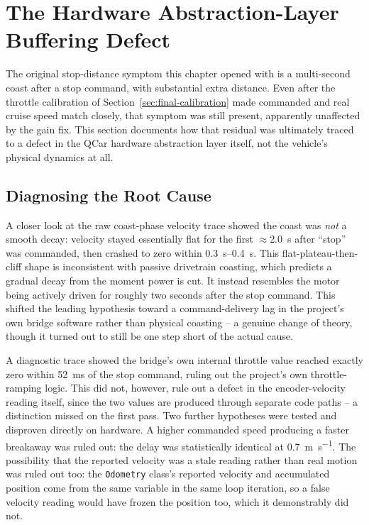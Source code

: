 \section{The Hardware Abstraction-Layer Buffering Defect}
\label{sec:readmode-bug}

The original stop-distance symptom this chapter opened with is a
multi-second coast after a stop command, with substantial extra
distance. Even after the throttle calibration of
Section~\ref{sec:final-calibration} made commanded and real cruise
speed match closely, that symptom was still present, apparently
unaffected by the gain fix. This section documents how that residual
was ultimately traced to a defect in the QCar hardware abstraction
layer itself, not the vehicle's physical dynamics at all.

\subsection{Diagnosing the Root Cause}
\label{sec:coast-shape-analysis}

A closer look at the raw coast-phase velocity trace showed the coast
was \emph{not} a smooth decay: velocity stayed essentially flat for
the first $\approx$\SI{2.0}{\second} after ``stop'' was commanded,
then crashed to zero within \SIrange{0.3}{0.4}{\second}. This
flat-plateau-then-cliff shape is inconsistent with passive drivetrain
coasting, which predicts a gradual decay from the moment power is
cut. It instead resembles the motor being actively driven for
roughly two seconds after the stop command. This shifted the leading
hypothesis toward a command-delivery lag in the project's own bridge
software rather than physical coasting -- a genuine change of theory,
though it turned out to still be one step short of the actual cause.

A diagnostic trace showed the bridge's own internal throttle value
reached exactly zero within \SI{52}{\milli\second} of the stop
command, ruling out the project's own throttle-ramping logic. This
did not, however, rule out a defect in the encoder-velocity reading
itself, since the two values are produced through separate code
paths -- a distinction missed on the first pass. Two further
hypotheses were tested and disproven directly on hardware. A higher
commanded speed producing a faster breakaway was ruled out: the
delay was statistically identical at \SI{0.7}{\meter\per\second}.
The possibility that the reported velocity was a stale reading
rather than real motion was ruled out too: the \texttt{Odometry}
class's reported velocity and accumulated position come from the
same variable in the same loop iteration, so a false velocity
reading would have frozen the position too, which it demonstrably
did not.

